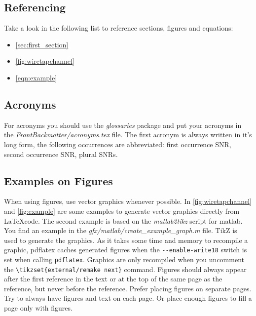 \subsection{Referencing}

Take a look in the following list to reference sections, figures and equations:
\begin{itemize}
	\item \autoref{sec:first_section}
	\item \autoref{fig:wiretapchannel}
	\item \autoref{eqn:example}
\end{itemize}


\subsection{Acronyms}
For acronyms you should use the \emph{glossaries} package and put your acronyms
in the \emph{FrontBackmatter/acronyms.tex} file. The first acronym is always
written in it's long form, the following occurrences are abbreviated: first
occurrence \gls{SNR}, second occurrence \gls{SNR}, plural \glspl{SNR}.


\subsection{Examples on Figures}

\sloppy
When using figures, use vector graphics whenever possible. In
\autoref{fig:wiretapchannel} and \autoref{fig:example} are some examples to
generate vector graphics directly from \LaTeX code. The second example is based
on the \emph{matlab2tikz} script for matlab. You find an example in the
\mbox{\emph{gfx/matlab/create\_example\_graph.m}} file. TikZ is used to generate
the graphics. As it takes some time and memory to recompile a graphic, pdflatex
caches generated figures when the \lstinline|--enable-write18| switch is set
when calling \lstinline|pdflatex|. Graphics are only recompiled when you
uncomment the \lstinline|\tikzset{external/remake next}| command. Figures should
always appear after the first reference in the text or at the top of the same
page as the reference, but never before the reference. Prefer placing figures on
separate pages. Try to always have figures and text on each page. Or place
enough figures to fill a page only with figures.

